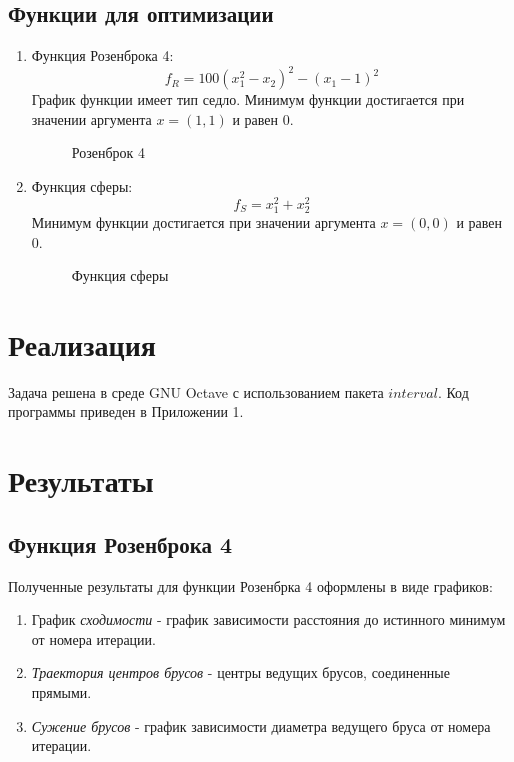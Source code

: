 \documentclass[14pt,a4paper,article]{ncc}
\begin{document}
\subsection{Функции для оптимизации}
\begin{enumerate}
    \item Функция Розенброка 4:
    $$f_R = 100(x_1^2 -x_2)^2 - (x_1 - 1)^2$$
    График функции имеет тип седло. Минимум функции достигается при значении аргумента $x = (1,1)$ и равен $0$.
    \begin{figure}[h]
        \caption{Розенброк 4}
        \label{fig:image}
    \end{figure}

    \item Функция сферы:
    $$f_S = x_1^2 + x_2^2$$
    Минимум функции достигается при значении аргумента $x = (0,0)$ и равен $0$.
    \begin{figure}[H]
        \caption{Функция сферы}
        \label{fig:image}
    \end{figure}
\end{enumerate}

\section{Реализация}
Задача решена в среде GNU Octave с использованием пакета $interval$.
Код программы приведен в Приложении 1.

\section{Результаты}
\subsection{Функция Розенброка 4}
Полученные результаты для функции Розенбрка 4 оформлены в виде графиков:
\begin{enumerate}
    \item График \textit{сходимости} - график зависимости расстояния до истинного минимум от номера итерации.
    \item \textit{Траектория центров брусов} - центры ведущих брусов, соединенные прямыми.
    \item \textit{Сужение брусов} - график зависимости диаметра ведущего бруса от номера итерации.
\end{enumerate}
\end{document}
